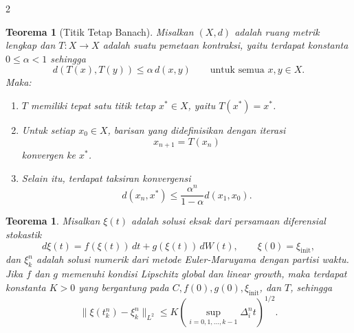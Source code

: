\documentclass[a4paper,extrafontsizes, 9pt]{memoir}
\theoremstyle{definition}
\theoremstyle{plain}
\newtheorem{teorema}[kalstok]{Teorema}
\theoremstyle{remark}
\begin{document}
\begin{multicols}{2}
  \begin{teorema}[Titik Tetap Banach]
    Misalkan $(X,d)$ adalah ruang metrik lengkap dan $T:X\to X$ adalah suatu pemetaan kontraksi,
    yaitu terdapat konstanta $0\le \alpha<1$ sehingga
    \[d(T(x),T(y))\le \alpha\, d(x,y)\qquad \text{untuk semua }x,y\in X.\]
    Maka:
    \begin{enumerate}[leftmargin=*, itemsep=0.5mm]
      \item $T$ memiliki tepat satu titik tetap $x^*\in X$, yaitu $T(x^*)=x^*$.
      \item Untuk setiap $x_0\in X$, barisan yang didefinisikan dengan iterasi
            \[x_{n+1}=T(x_n)\]
            konvergen ke $x^*$.
      \item Selain itu, terdapat taksiran konvergensi
            \[d(x_n,x^*)\le \frac{\alpha^n}{1-\alpha}d(x_1,x_0).\]
    \end{enumerate}
  \end{teorema}

  \begin{teorema}
    Misalkan $\xi(t)$ adalah solusi eksak dari persamaan diferensial stokastik
    \[d\xi(t)=f(\xi(t))\,dt+g(\xi(t))\,dW(t),\qquad \xi(0)=\xi_{\mathrm{init}},\]
    dan $\xi_k^n$ adalah solusi numerik dari metode Euler-Maruyama dengan partisi waktu.
    Jika $f$ dan $g$ memenuhi kondisi Lipschitz global dan linear growth, maka terdapat
    konstanta $K>0$ yang bergantung pada $C,f(0),g(0),\xi_{\mathrm{init}}$, dan $T$, sehingga
    \[\|\xi(t_k^n)-\xi_k^n\|_{L^2}
      \le K\left(\sup_{i=0,1,\ldots,k-1}\Delta_i^n t\right)^{1/2}.\]
  \end{teorema}
\end{multicols}
\end{document}

